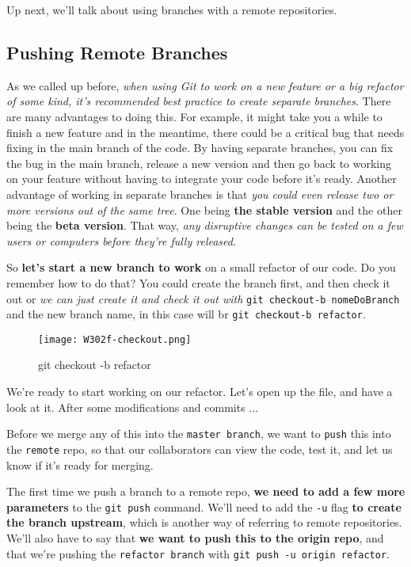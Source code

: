 Up next, we'll talk about using branches with a remote repositories.

\subsection{Pushing Remote Branches} \label{W303b}

As we called up before, \textit{when using Git to work on a new feature or a big refactor of some kind, it's recommended best practice to create separate branches}. There are many advantages to doing this. For example, it might take you a while to finish a new feature and in the meantime, there could be a critical bug that needs fixing in the main branch of the code. By having separate branches, you can fix the bug in the main branch, release a new version and then go back to working on your feature without having to integrate your code before it's ready. Another advantage of working in separate branches is that \textit{you could even release two or more versions out of the same tree}. One being \textbf{the stable version} and the other being the \textbf{beta version}. That way, \textit{any disruptive changes can be tested on a few users or computers before they're fully released}. 

So \textbf{let's start a new branch to work} on a small refactor of our code. Do you remember how to do that? You could create the branch first, and then check it out or \textit{we can just create it and check it out with} \verb|git checkout-b nomeDoBranch| and the new branch name, in this case will br \verb|git checkout-b refactor|.

\begin{figure} 
	\caption{git checkout -b refactor}
	\centering
	\texttt{[image: W302f-checkout.png]}
	\label{W302f-checkout}
\end{figure}


We're ready to start working on our refactor. Let's open up the file, and have a look at it.
After some modifications and commits ...

Before we merge any of this into the \verb|master branch|, we want to \verb|push| this into the \verb|remote| repo, so that our collaborators can view the code, test it, and let us know if it's ready for merging.

The first time we push a branch to a remote repo, \textbf{we need to add a few more parameters} to the \verb|git push| command. 
We'll need to add the \verb|-u| flag \textbf{to create the branch upstream}, which is another way of referring to remote repositories. We'll also have to say that \textbf{we want to push this to the origin repo}, and that we're pushing the \verb|refactor branch| with \verb|git push -u origin refactor|.

